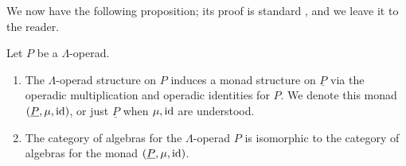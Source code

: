 We now have the following proposition; its proof is standard \cite{maygeom}, and we leave it to the reader.

\begin{prop}\label{prop:op=monad1}  Let $P$ be a $\Lambda$-operad.
  \begin{enumerate}
    \item The $\Lambda$-operad structure on $P$ induces a monad structure on $\underline{P}$ via the operadic multiplication and operadic identities for $P$. We denote this monad $(\underline{P}, \mu, \textrm{id})$, or just $\underline{P}$ when $\mu, \textrm{id}$ are understood.
    \item The category of algebras for the $\Lambda$-operad $P$ is isomorphic to the category of algebras for the monad $(\underline{P}, \mu, \textrm{id})$.
  \end{enumerate}
\end{prop}


